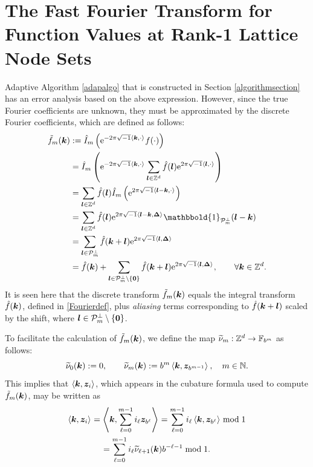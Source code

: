 \documentclass[graybox]{svmult}
\newcommand{\Z}{\mathbb{Z}} %
\newcommand{\N}{\mathbb{N}} %
\newcommand{\F}{\mathbb{F}} %
\newcommand{\bszero}{\boldsymbol{0}} %
\newcommand{\bsz}{\boldsymbol{z}}    %
\newcommand{\bsDelta}{\boldsymbol{\Delta}}    %
\newcommand{\ind}{\mathbbold{1}}
\begin{document}
\section{The Fast Fourier Transform for Function Values at Rank-1 Lattice Node Sets}\label{FFT}

Adaptive Algorithm \ref{adapalgo} that is constructed in Section \ref{algorithmsection} has an error analysis based on the above expression.  However, since the true Fourier coefficients are unknown, they must be approximated by the discrete Fourier coefficients, which are defined as follows:
\begin{subequations} \label{tfdefalias}
\begin{align}
\tf_m(\bsk)
&:= \hI_m\left( \E^{-2 \pi \sqrt{-1} \ip{\bsk}{\cdot}} f(\cdot) \right) \label{tfdef}\\
\nonumber
& = \hI_m\left( \E^{-2 \pi \sqrt{-1} \ip{\bsk}{\cdot}} \sum_{\bsl \in \Z^d} \hf(\bsl) \E^{2 \pi \sqrt{-1} \ip{\bsl}{\cdot}}  \right) \\
\nonumber
& = \sum_{\bsl \in \Z^d} \hf(\bsl) \hI_m\left( \E^{2 \pi \sqrt{-1} \ip{\bsl-\bsk}{\cdot}}  \right) \\
\nonumber
& = \sum_{\bsl \in \Z^d} \hf(\bsl) \E^{2 \pi \sqrt{-1} \ip{\bsl - \bsk}{\bsDelta}} \ind_{\cp_m^{\perp}}(\bsl - \bsk) \\
\nonumber
& = \sum_{\bsl \in \cp^{\perp}_m} \hf(\bsk+\bsl) \E^{2 \pi \sqrt{-1} \ip{\bsl }{\bsDelta}} \\
&= \hf(\bsk) + \sum_{\bsl \in \cp^{\perp}_m\setminus \{\bszero\}} \hf(\bsk+\bsl) \E^{2 \pi \sqrt{-1} \ip{\bsl }{\bsDelta}}, \qquad \forall \bsk \in \Z^d. \label{tfassum}
\end{align}
\end{subequations}
It is seen here that the discrete transform $\tilde{f}_m(\boldsymbol{k})$ equals the integral transform $\hat{f}(\boldsymbol{k})$, defined in \eqref{Fourierdef}, plus \emph{aliasing} terms corresponding to $\hat{f}(\boldsymbol{k}+\boldsymbol{l})$ scaled by the shift, where $\bsl \in \cp_{m}^{\perp}\setminus \left\{\bszero\right\}$.


To facilitate the calculation of $\tilde{f}_m(\boldsymbol{k})$, we define the map $\tnu_m : \Z^d \to \F_{b^m}$ as follows:
\begin{equation} \label{kdotzbm}
\tnu_{0}(\bsk) := 0, \qquad
\tnu_{m}(\bsk) := b^{m} \ip{\bsk}{\bsz_{b^{m-1}}}, \quad m \in \N.
\end{equation}
This implies that $\ip{\bsk}{\bsz_i}$, which appears in the cubature formula used to compute $\tilde{f}_m(\boldsymbol{k})$, may be written as
\begin{multline} \label{kdotzi}
\ip{\bsk}{\bsz_i} = \ip{\bsk}{\sum_{\ell=0}^{m-1} i_\ell \bsz_{b^{\ell}}} = \sum_{\ell=0}^{m-1} i_\ell \ip{\bsk}{\bsz_{b^{\ell}}} \bmod 1 \\
=\sum_{\ell=0}^{m-1} i_\ell \tnu_{\ell+1}(\bsk)  b^{-\ell-1} \bmod 1.
\end{multline}
\end{document}
